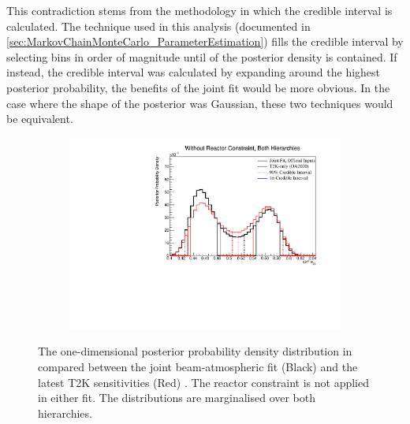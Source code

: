 This contradiction stems from the methodology in which the credible interval is calculated. The technique used in this analysis (documented in \autoref{sec:MarkovChainMonteCarlo_ParameterEstimation}) fills the credible interval by selecting bins in order of magnitude until  of the posterior density is contained. If instead, the credible interval was calculated by expanding around the highest posterior probability, the benefits of the joint fit would be more obvious. In the case where the shape of the posterior was Gaussian, these two techniques would be equivalent.

\begin{figure}[h]
  \begin{subfigure}[t]{0.98\textwidth}
    \includegraphics[width=\textwidth, trim={0mm 0mm 0mm 0mm}, clip,page=1]{Figures/OA/JointFit_OA2020_Comp_AsimovB/ContourComparison_1D_th23_BH_2_woRC_UnSmeared_CredibleInterval.pdf}
  \end{subfigure}
  \caption{The one-dimensional posterior probability density distribution in  compared between the joint beam-atmospheric fit (Black) and the latest T2K sensitivities (Red) \cite{t2k_tn_399}. The reactor constraint is not applied in either fit. The distributions are marginalised over both hierarchies.}
  \label{fig:OscillationAnalysis_JointFit_AsimovB_TH23}
\end{figure}

